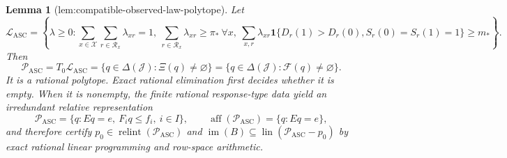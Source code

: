 \documentclass{article}
\newtheorem{lemma}{Lemma}
\begin{document}
\begin{lemma}[lem:compatible-observed-law-polytope]\label{lem:compatible-observed-law-polytope}
Let
\[
 \mathcal L_{\mathrm{ASC}}
 =\left\{\lambda\ge0:
 \sum_{x\in\mathcal X}\sum_{r\in\mathcal R_x}\lambda_{xr}=1,
 \ \sum_{r\in\mathcal R_x}\lambda_{xr}\ge\pi_*\ \forall x,
 \ \sum_{x,r}\lambda_{xr}
 \mathbf 1\{D_r(1)>D_r(0),S_r(0)=S_r(1)=1\}\ge m_*
 \right\}.
\]
Then
\[
 \mathcal P_{\mathrm{ASC}}
 =T_0\mathcal L_{\mathrm{ASC}}
 =\{q\in\Delta(\mathcal J):\Xi(q)\ne\varnothing\}
 =\{q\in\Delta(\mathcal J):\mathcal F(q)\ne\varnothing\}.
\]
It is a rational polytope. Exact rational elimination first decides whether it is empty.  When it is nonempty, the finite rational response-type data yield an irredundant relative representation
\[
 \mathcal P_{\mathrm{ASC}}=\{q:Eq=e,\ F_iq\le f_i,\ i\in I\},
 \qquad
 \operatorname{aff}(\mathcal P_{\mathrm{ASC}})=\{q:Eq=e\},
\]
and therefore certify \(p_0\in\operatorname{relint}(\mathcal P_{\mathrm{ASC}})\) and \(\operatorname{im}(B)\subseteq\operatorname{lin}(\mathcal P_{\mathrm{ASC}}-p_0)\) by exact rational linear programming and row-space arithmetic.
\end{lemma}
\end{document}
